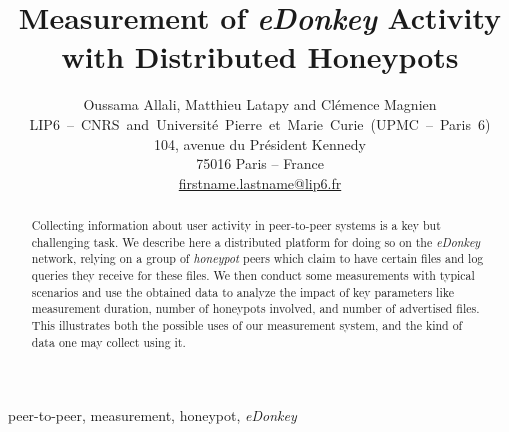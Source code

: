 \documentclass[final,
notitlepage,
narroweqnarray,
	inline,
	twoside,
]{ieee}
\newcommand{\noteperso}[1]{\begin{center}
 \fbox{\begin{minipage}{6cm}#1\end{minipage}}\end{center}}
\renewcommand{\noteperso}[1]{}
\begin{document}
\title[Measurement of eDonkey Activity
with Distributed Honeypots]{Measurement of {\em eDonkey} Activity\\
with Distributed Honeypots}

\author{
\begin{minipage}{12.3cm}
\center
Oussama Allali, Matthieu Latapy and Cl{\'e}mence Magnien\\
\medskip
\mbox{LIP6 -- CNRS and Universit{\'e} Pierre et Marie Curie (UPMC -- Paris 6)}\\
104, avenue du Pr\'esident Kennedy\\
75016 Paris -- France\\
\url{firstname.lastname@lip6.fr}
\end{minipage}
}

\maketitle               

\begin{abstract} 
Collecting information about user activity in peer-to-peer systems is a key but challenging task. We describe here a distributed platform for doing so on the {\em eDonkey} network, relying on a group of {\em honeypot} peers which claim to have certain files and log queries they receive for these files. We then conduct some measurements with typical scenarios and use the obtained data to analyze the impact of key parameters like measurement duration, number of honeypots involved, and number of advertised files. This illustrates both the possible uses of our measurement system, and the kind of data one may collect using it.
\end{abstract}

\begin{keywords}
peer-to-peer, measurement, honeypot, {\em eDonkey}
\end{keywords}

\noteperso{A FAIRE apres soumission:
\begin{itemize}
\item un papier sur la popularite des fichiers et/ou le blacklisting, pour TSI ?
\item mettre les donnees en ligne, anonymisees et en XML
\end{itemize}
}

\noteperso{A FAIRE avant soumission:
\begin{itemize}
\item uniformiser les noms de messages (y compris dans les figures)
\item dans les figures 2 et 3, mettre comme legendes des axes verticaux : "Total number of peers" et "Number of new peers"
\item dans les figures 5 et 6, ajouter comme legende de l'axe vertical : "Number of peers"; figure 7 ajouter comme legende verticale "Number of REQUEST-PART queries"
\item figure 10: honeypotS
\end{itemize}
}
\end{document}
